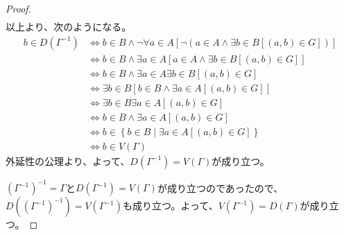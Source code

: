 \documentclass[a4paper]{jsarticle}
\begin{document}
\begin{proof}
\begin{align*}
\end{align*}
以上より、次のようになる。
\begin{align*}
b \in D\left( \varGamma^{- 1} \right) &\Leftrightarrow b \in B \land \neg\forall a \in A\left[ \neg\left( a \in A \land \exists b \in B\left[ (a,b) \in G \right] \right) \right]\\
&\Leftrightarrow b \in B \land \exists a \in A\left[ a \in A \land \exists b \in B\left[ (a,b) \in G \right] \right]\\
&\Leftrightarrow b \in B \land \exists a \in A\exists b \in B\left[ (a,b) \in G \right]\\
&\Leftrightarrow \exists b \in B\left[ b \in B \land \exists a \in A\left[ (a,b) \in G \right] \right]\\
&\Leftrightarrow \exists b \in B\exists a \in A\left[ (a,b) \in G \right]\\
&\Leftrightarrow b \in B \land \exists a \in A\left[ (a,b) \in G \right]\\
&\Leftrightarrow b \in \left\{ b \in B \middle| \exists a \in A\left[ (a,b) \in G \right] \right\}\\
&\Leftrightarrow b \in V(\varGamma)
\end{align*}
外延性の公理より、よって、$D\left( \varGamma^{- 1} \right) = V(\varGamma)$が成り立つ。\par
$\left( \varGamma^{- 1} \right)^{- 1} = \varGamma$と$D\left( \varGamma^{- 1} \right) = V(\varGamma)$が成り立つのであったので、$D\left( \left( \varGamma^{- 1} \right)^{- 1} \right) = V\left( \varGamma^{- 1} \right)$も成り立つ。よって、$V\left( \varGamma^{- 1} \right) = D(\varGamma)$が成り立つ。
\end{proof}
\end{document}
